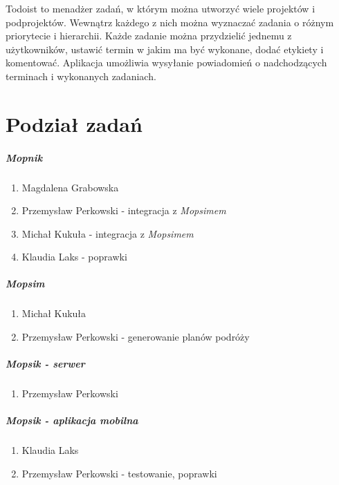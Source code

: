 Todoist to menadżer zadań, w którym można utworzyć wiele projektów i podprojektów. Wewnątrz każdego z nich można wyznaczać zadania o różnym priorytecie i hierarchii. Każde zadanie można przydzielić jednemu z użytkowników, ustawić termin w jakim ma być wykonane, dodać etykiety i komentować. Aplikacja umożliwia wysyłanie powiadomień o nadchodzących terminach i wykonanych zadaniach.


\chapter{Podział zadań}
\paragraph{Mopnik}
\begin{enumerate}
\item Magdalena Grabowska
\item Przemysław Perkowski - integracja z \textit{Mopsimem}
\item Michał Kukuła - integracja z \textit{Mopsimem}
\item Klaudia Laks - poprawki
\end{enumerate}

\paragraph{Mopsim}
\begin{enumerate}
\item Michał Kukuła
\item Przemysław Perkowski - generowanie planów podróży
\end{enumerate}

\paragraph{Mopsik - serwer}
\begin{enumerate}
\item Przemysław Perkowski
\end{enumerate}

\paragraph{Mopsik - aplikacja mobilna}
\begin{enumerate}
\item Klaudia Laks
\item Przemysław Perkowski - testowanie, poprawki
\end{enumerate}

